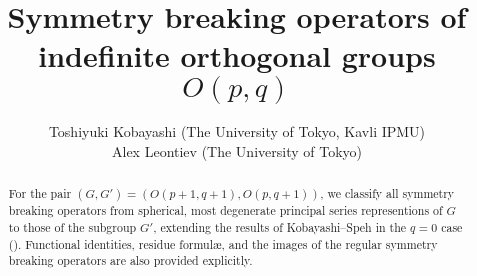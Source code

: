 \documentclass[12pt]{article} %
\theoremstyle{definition}
\theoremstyle{exampstyle} \newtheorem{examp}[theorem]{Theorem}
\begin{document}
\title{Symmetry breaking operators of indefinite orthogonal groups $O(p,q)$}

  \author{Toshiyuki Kobayashi (The University of Tokyo, Kavli IPMU)\\
  Alex Leontiev (The University of Tokyo)}




  \maketitle
\begin{abstract}
For the pair $(G, G') =(O(p+1, q+1), O(p,q+1))$, we classify
all symmetry breaking operators from spherical, most degenerate 
principal series representions of 
$G$ to those of the subgroup $G'$, extending the results of Kobayashi--Speh in the $q=0$ 
case (\cite{kobayashi2015symmetry}).
Functional identities, residue formul\ae, and the images of the regular symmetry breaking operators are also provided 
explicitly.
\end{abstract}
\end{document}
